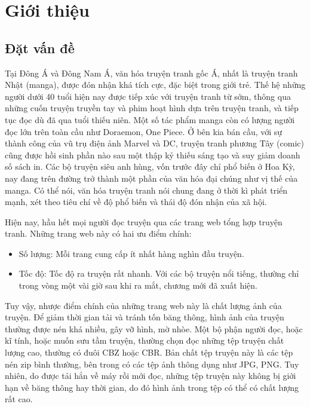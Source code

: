 \documentclass[../../thesis]{subfiles}
\begin{document}
\chapter{Giới thiệu}\label{chap:intro}


\section{Đặt vấn đề}\label{sec:background}

Tại Đông Á và Đông Nam Á, văn hóa truyện tranh gốc Á, nhất là truyện tranh Nhật
(manga), được đón nhận khá tích cực, đặc biệt trong giới trẻ. Thế hệ những người
dưới 40 tuổi hiện nay được tiếp xúc với truyện tranh từ sớm, thông qua những
cuốn truyện truyền tay và phim hoạt hình dựa trên truyện tranh, và tiếp tục đọc
dù đã qua tuổi thiếu niên. Một số tác phẩm manga còn có lượng người đọc lớn trên
toàn cầu như Doraemon, One Piece. Ở bên kia bán cầu, với sự thành công của vũ
trụ điện ảnh Marvel và DC, truyện tranh phương Tây (comic) cũng được hồi sinh
phần nào sau một thập kỷ thiếu sáng tạo và suy giảm doanh số sách in. Các bộ
truyện siêu anh hùng, vốn trước đây chỉ phổ biến ở Hoa Kỳ, nay đang trên đường
trở thành một phần của văn hóa đại chúng như vị thế của manga. Có thể nói, văn
hóa truyện tranh nói chung đang ở thời kì phát triển mạnh, xét theo tiêu chí về
độ phổ biến và thái độ đón nhận của xã hội.

Hiện nay, hầu hết mọi người đọc truyện qua các trang web tổng hợp truyện tranh.
Những trang web này có hai ưu điểm chính:

\begin{itemize}
    \item
        Số lượng: Mỗi trang cung cấp ít nhất hàng nghìn đầu truyện.
    \item
        Tốc độ: Tốc độ ra truyện rất nhanh. Với các bộ truyện nổi tiếng, thường
        chỉ trong vòng một vài giờ sau khi ra mắt, chương mới đã xuất hiện.
\end{itemize}

Tuy vậy, nhược điểm chính của những trang web này là chất lượng ảnh của truyện.
Để giảm thời gian tải và tránh tốn băng thông, hình ảnh của truyện thường được
nén khá nhiều, gây vỡ hình, mờ nhòe. Một bộ phận người đọc, hoặc kĩ tính, hoặc
muốn sưu tầm truyện, thường chọn đọc những tệp truyện chất lượng cao, thường có
đuôi CBZ hoặc CBR. Bản chất tệp truyện này là các tệp nén zip bình thường, bên
trong có các tệp ảnh thông dụng như JPG, PNG. Tuy nhiên, do được tải hẳn về máy
rồi mới đọc, những tệp truyện này không bị giới hạn về băng thông hay thời gian,
do đó hình ảnh trong tệp có thể có chất lượng rất cao.
\end{document}
